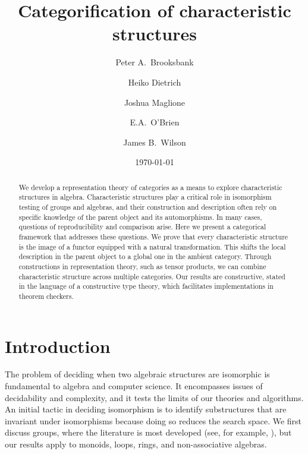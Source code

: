 \documentclass{amsart}
\title{Categorification of characteristic structures}
\date{\today}
\author[P.\ A.\ Brooksbank]{Peter A.\ Brooksbank}
\author[H.\ Dietrich]{Heiko Dietrich}
\author[J.\ Maglione]{Joshua Maglione}
\author[E.\ A.\ O'Brien]{E.A.\ O'Brien}
\author[J.\ B.\ Wilson]{James B.\ Wilson}
\numberwithin{lstfloat}{section}
\theoremstyle{definition}
\theoremstyle{remark}
\numberwithin{equation}{section}
\begin{document}
  

\begin{abstract}
   We develop a representation theory of categories as a means to 
   explore characteristic structures in algebra.
  Characteristic structures play a critical role in isomorphism testing of
  groups and algebras, and their construction and description often rely on
  specific knowledge of the parent object and its automorphisms. In many cases,
  questions of reproducibility and comparison arise. Here we present a 
  categorical framework that addresses these questions. We prove that every
  characteristic structure is the image of a functor equipped with a 
  natural transformation. 
  This  shifts the local description in the parent object to a
  global one in the ambient category.
  Through  constructions in representation theory, such as tensor products, 
  we can combine characteristic structure across multiple categories.
  Our results are constructive,
  stated in the language of a constructive type theory, which facilitates
  implementations in theorem checkers.
\end{abstract}

\maketitle

\newcommand{\customlabel}[2]{%
    \begingroup
    \renewcommand{\thetheorem}{#1}%
    \refstepcounter{theorem}%
    \label{#2}%
    \endgroup
}



\section{Introduction}
\label{sec:intro}

The problem of deciding when two algebraic structures are isomorphic  
is fundamental to algebra and computer science. It encompasses issues of
decidability and complexity, and it tests the limits of our theories and
algorithms. An initial tactic in deciding isomorphism is to
identify substructures that are invariant under isomorphisms because doing so
reduces the search space. We first discuss groups, where the literature is 
most developed (see, for example, ), 
but our results apply to monoids, loops, rings, and non-associative algebras.
 
\end{document}
